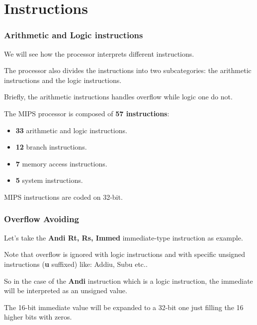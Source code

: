 %
%

\section{Instructions}


\begin{frame}
  \frametitle{Arithmetic and Logic instructions}

  We will see how the processor interprets different instructions.

  \nl

  The processor also divides the instructions into two subcategories:
  the arithmetic instructions and the logic instructions.

  \nl

  Briefly, the arithmetic instructions handles overflow while logic
  one do not.

  \nl

  The MIPS processor is composed of \textbf{57 instructions}:

  \begin{itemize}[<+->]
    \item
      \textbf{33} arithmetic and logic instructions.
    \item
      \textbf{12} branch instructions.
    \item
      \textbf{7} memory access instructions.
    \item
      \textbf{5} system instructions.
  \end{itemize}

  \nl

  MIPS instructions are coded on 32-bit.
\end{frame}


\begin{frame}
  \frametitle{Overflow Avoiding}

  Let's take the \textbf{Andi Rt, Rs, Immed} immediate-type
  instruction as example.

  \nl

  Note that overflow is ignored with logic instructions and with
  specific unsigned instructions (\textbf{u} suffixed) like:
  Addiu, Subu etc..

  \nl

  So in the case of the \textbf{Andi} instruction which is a logic
  instruction, the immediate will be interpreted as an unsigned value.

  \nl

  The 16-bit immediate value will be expanded to a 32-bit one just
  filling the 16 higher bits with zeros.

  \begin{center}
  \end{center}
\end{frame}

